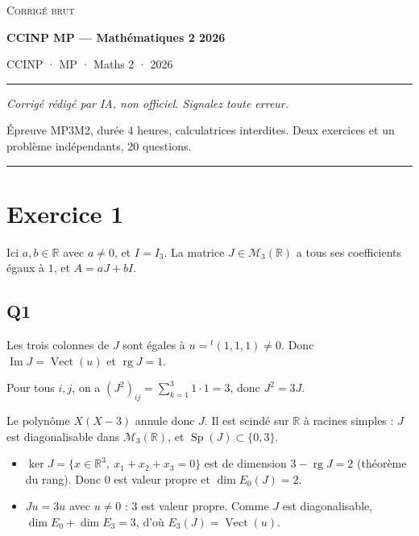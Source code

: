 \documentclass[11pt,a4paper]{article}
\providecommand{\tightlist}{\setlength{\itemsep}{0pt}\setlength{\parskip}{0pt}}
\begin{document}
\thispagestyle{plain}
\begin{center}
  {\small\scshape Corrigé brut}\par\smallskip
  {\LARGE\bfseries CCINP MP — Mathématiques 2 2026\par}\medskip
  {\large CCINP · MP · Maths 2 · 2026\par}
\end{center}
\vspace{2pt}\hrule\vspace{8pt}

\emph{Corrigé rédigé par IA, non officiel. Signalez toute erreur.}

Épreuve MP3M2, durée 4 heures, calculatrices interdites. Deux exercices et un problème indépendants, 20 questions.

\begin{center}\rule{0.5\linewidth}{0.5pt}\end{center}

\hypertarget{exercice-1}{%
\section{Exercice 1}\label{exercice-1}}

Ici \(a,b\in\mathbb R\) avec \(a\neq 0\), et \(I=I_3\). La matrice \(J\in\mathcal M_3(\mathbb R)\) a tous ses coefficients égaux à \(1\), et \(A=aJ+bI\).

\hypertarget{q1}{%
\subsection{Q1}\label{q1}}

Les trois colonnes de \(J\) sont égales à \(u={}^t(1,1,1)\neq0\). Donc \(\operatorname{Im}J=\operatorname{Vect}(u)\) et \(\boxed{\operatorname{rg}J=1}\).

Pour tous \(i,j\), on a \((J^2)_{ij}=\sum_{k=1}^3 1\cdot1=3\), donc \(J^2=3J\).

Le polynôme \(X(X-3)\) annule donc \(J\). Il est scindé sur \(\mathbb R\) à racines simples : \(J\) est diagonalisable dans \(\mathcal M_3(\mathbb R)\), et \(\operatorname{Sp}(J)\subset\{0,3\}\).

\begin{itemize}
\tightlist
\item
  \(\ker J=\{x\in\mathbb R^3,\ x_1+x_2+x_3=0\}\) est de dimension \(3-\operatorname{rg}J=2\) (théorème du rang). Donc \(0\) est valeur propre et \(\dim E_0(J)=2\).
\item
  \(Ju=3u\) avec \(u\neq0\) : \(3\) est valeur propre. Comme \(J\) est diagonalisable, \(\dim E_0+\dim E_3=3\), d'où \(E_3(J)=\operatorname{Vect}(u)\).
\end{itemize}
\end{document}
